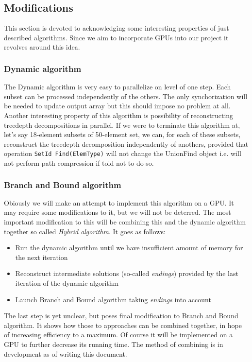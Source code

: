 \subsection{Modifications}
This section is devoted to acknowledging some interesting properties of just described algorithms. Since we aim to incorporate GPUs into our project it revolves around this idea.
\subsubsection{Dynamic algorithm}
The Dynamic algorithm is very easy to parallelize on level of one step. Each subset can be processed independently of the others. The only synchorization will be needed to update output array but this should impose no problem at all. Another interesting property of this algorithm is possibility of reconstructing treedepth decompositions in parallel. If we were to terminate this algorithm at, let's say 18-element subsets of 50-element set, we can, for each of these subsets, reconstruct the treedepth decomposition independently of anothers, provided that operation \texttt{SetId Find(ElemType)} will not change the UnionFind object i.e. will not perform path compression if told not to do so.
\subsubsection{Branch and Bound algorithm}
Obiously we will make an attempt to implement this algorithm on a GPU. It may require some modifications to it, but we will not be deterred. The most important modification to this will be combining this and the dynamic algorithm together so called \emph{Hybrid algorithm}. It goes as follows:
\begin{itemize}
	\item Run the dynamic algorithm until we have insufficient amount of memory for the next iteration
	\item Reconstruct intermediate solutions (so-called \emph{endings}) provided by the last iteration of the dynamic algorithm
	\item Launch Branch and Bound algorithm taking \emph{endings} into account
\end{itemize}
The last step is yet unclear, but poses final modification to Branch and Bound algorithm. It shows how those to approaches can be combined together, in hope of increasing efficiency to a maximum. Of course it will be implemented on a GPU to further decrease its running time. The method of combining is in development as of writing this document.
